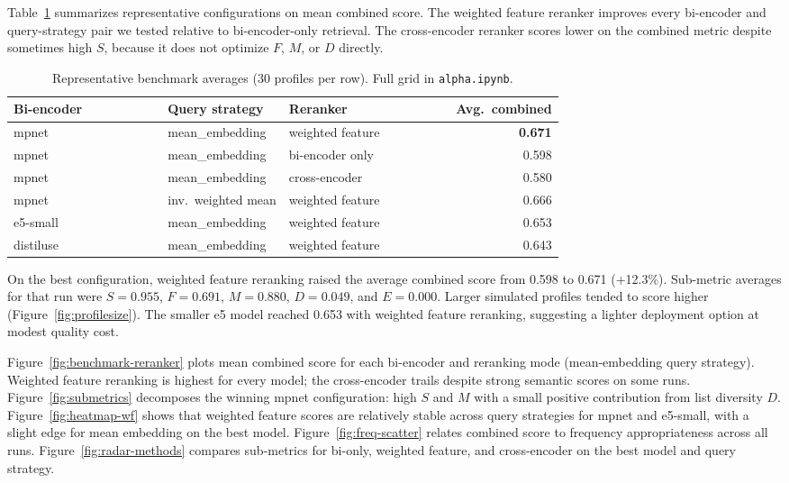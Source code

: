 \documentclass{article}
\begin{document}
Table~\ref{tab:benchmark} summarizes representative configurations on mean combined score. The weighted feature reranker improves every bi-encoder and query-strategy pair we tested relative to bi-encoder-only retrieval. The cross-encoder reranker scores lower on the combined metric despite sometimes high $S$, because it does not optimize $F$, $M$, or $D$ directly.

\begin{table}[t]
\centering
\small
\begin{tabularx}{\linewidth}{>{\raggedright\arraybackslash}p{0.28\linewidth}p{0.22\linewidth}p{0.22\linewidth}r}
\toprule
Bi-encoder & Query strategy & Reranker & Avg.\ combined \\
\midrule
mpnet & mean\_embedding & weighted feature & \textbf{0.671} \\
mpnet & mean\_embedding & bi-encoder only  & 0.598 \\
mpnet & mean\_embedding & cross-encoder    & 0.580 \\
mpnet & inv.\ weighted mean & weighted feature & 0.666 \\
e5-small & mean\_embedding & weighted feature & 0.653 \\
distiluse & mean\_embedding & weighted feature & 0.643 \\
\bottomrule
\end{tabularx}
\caption{Representative benchmark averages (30 profiles per row). Full grid in \texttt{alpha.ipynb}.}
\label{tab:benchmark}
\end{table}

On the best configuration, weighted feature reranking raised the average combined score from 0.598 to 0.671 (+12.3\%). Sub-metric averages for that run were $S{=}0.955$, $F{=}0.691$, $M{=}0.880$, $D{=}0.049$, and $E{=}0.000$. Larger simulated profiles tended to score higher (Figure~\ref{fig:profilesize}). The smaller e5 model reached 0.653 with weighted feature reranking, suggesting a lighter deployment option at modest quality cost.

Figure~\ref{fig:benchmark-reranker} plots mean combined score for each bi-encoder and reranking mode (mean-embedding query strategy). Weighted feature reranking is highest for every model; the cross-encoder trails despite strong semantic scores on some runs. Figure~\ref{fig:submetrics} decomposes the winning mpnet configuration: high $S$ and $M$ with a small positive contribution from list diversity $D$. Figure~\ref{fig:heatmap-wf} shows that weighted feature scores are relatively stable across query strategies for mpnet and e5-small, with a slight edge for mean embedding on the best model. Figure~\ref{fig:freq-scatter} relates combined score to frequency appropriateness across all runs. Figure~\ref{fig:radar-methods} compares sub-metrics for bi-only, weighted feature, and cross-encoder on the best model and query strategy.
\end{document}
